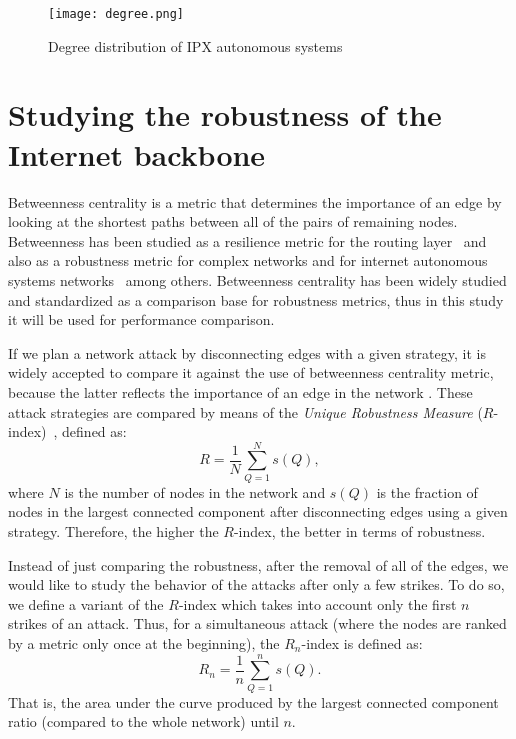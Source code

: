 \documentclass{sig-alternate-10pt}
\begin{document}
\begin{figure}[ht!]
  \centering
  \texttt{[image: degree.png]}
  \caption{Degree distribution of IPX autonomous systems}
  \label{fig:degree}
\end{figure}

\section{Studying the robustness of the Internet backbone}
\label{bet}


Betweenness centrality is a metric that determines the importance of an edge by looking at the shortest paths between all of the pairs of remaining nodes. Betweenness has been studied as a resilience metric for the routing layer~\cite{smith2011network} and also as a robustness metric for complex networks \cite{iyer2013attack} and for internet autonomous systems networks~\cite{mahadevan2006internet} among others.  Betweenness centrality has been widely studied and standardized as a comparison base for robustness metrics, thus in this study it will be used for performance comparison. 



If we plan a network attack by disconnecting edges with a given strategy, it is widely accepted to compare it against the use of  betweenness centrality metric, because the latter reflects the importance of an edge in the network \cite{iyer2013attack}. These attack strategies are compared by means of the \textit{Unique Robustness Measure} ($R$-index)~\cite{schneider2011mitigation}, defined as: 
\begin{equation}
R = \frac{1}{N}\sum_{Q=1}^{N} {s(Q)},
\end{equation}
where $N$ is the number of nodes in the network and $s(Q)$ is the fraction of nodes in the largest connected component after disconnecting edges using a given strategy.  Therefore, the higher the $R$-index, the better in terms of robustness.

Instead of just comparing the robustness, after the removal of all of the edges, we would like to study the behavior of the attacks after only a few strikes. To do so, we define a variant of the $R$-index which takes into account only the first $n$ strikes of an attack. Thus, for a simultaneous attack (where the nodes are ranked by a metric only once at the beginning), the $R_n$-index is defined as:
\begin{equation}
R_n = \frac{1}{n}\sum_{Q=1}^{n} {s(Q)}.
\end{equation}
That is, the area under the curve produced by the largest connected component ratio (compared to the whole network) until $n$.
\end{document}
